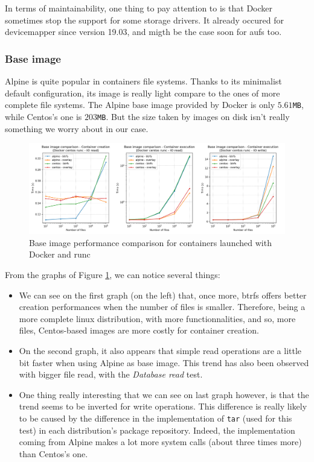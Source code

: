 In terms of maintainability, one thing to pay attention to is that Docker sometimes stop the support for some storage drivers.  It already occured for devicemapper since version 19.03, and migth be the case soon for aufs too.

\subsubsection{Base image}

Alpine is quite popular in containers file systems.  Thanks to its minimalist default configuration, its image is really light compare to the ones of more complete file systems.  The Alpine base image provided by Docker is only $5.61$\texttt{MB}, while Centos's one is $203$\texttt{MB}.  But the size taken by images on disk isn't really something we worry about in our case.

\begin{figure}[h!]
  \begin{center}
    \includegraphics[width=\linewidth]{images/question-1-base-image.png}
    \caption{Base image performance comparison for containers launched with Docker and runc}
    \label{fig:q1:base-image}
  \end{center}
\end{figure}

From the graphs of Figure \ref{fig:q1:base-image}, we can notice several things:
\begin{itemize}
  \item We can see on the first graph (on the left) that, once more, btrfs offers better creation performances when the number of files is smaller.  Therefore, being a more complete linux distribution, with more functionnalities, and so, more files, Centos-based images are more costly for container creation.
  \item On the second graph, it also appears that simple read operations are a little bit faster when using Alpine as base image.  This trend has also been observed with bigger file read, with the \textit{Database read} test.
  \item One thing really interesting that we can see on last graph however, is that the trend seems to be inverted for write operations.  This difference is really likely to be caused by the difference in the implementation of \texttt{tar} (used for this test) in each distribution's package repository.  Indeed, the implementation coming from Alpine makes a lot more system calls (about three times more) than Centos's one.
\end{itemize}

